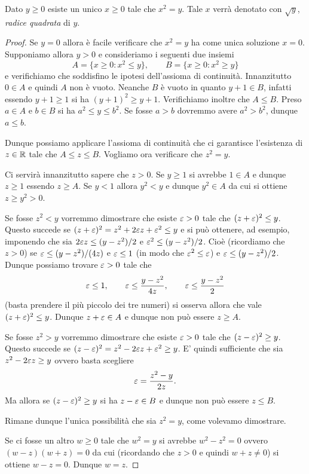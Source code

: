 \begin{theorem}
\label{th:radice_quadrata}
\mymark{***}
Dato $y\ge 0$ esiste un unico $x\ge 0$ tale che $x^2=y$.
Tale $x$ verrà denotato con $\sqrt y$, \emph{radice quadrata} di $y$.
\mymargin{$\sqrt{\cdot}$}
\end{theorem}
\begin{proof}
\mymark{*}
Se $y=0$ allora è facile verificare che $x^2=y$ ha come unica soluzione $x=0$.
Supponiamo allora $y>0$ e
consideriamo i seguenti due insiemi
\[
  A = \{x\ge 0 \colon x^2 \le y\},\qquad
  B = \{x\ge 0 \colon x^2 \ge y\}
\]
e verifichiamo che soddisfino le ipotesi dell'assioma di continuità.
Innanzitutto $0\in A$ e quindi $A$ non è vuoto.
Neanche $B$ è vuoto in quanto $y+1\in B$,
infatti essendo $y+1\ge 1$ si ha
$(y+1)^2 \ge y+1$. Verifichiamo inoltre che $A \le B$.
Preso $a\in A$ e $b\in B$ si ha $a^2 \le y \le b^2$.
Se fosse $a>b$ dovremmo avere $a^2>b^2$, dunque $a \le b$.

Dunque possiamo applicare l'assioma di continuità
che ci garantisce l'esistenza di $z\in \mathbb R$ tale che $A \le z \le B$.
Vogliamo ora verificare che $z^2 = y$.

Ci servirà innanzitutto sapere che $z>0$. Se $y\ge 1$ si avrebbe $1\in A$
e dunque $z\ge 1$ essendo $z\ge A$. Se $y<1$ allora $y^2 < y$ e dunque $y^2 \in A$
da cui si ottiene $z\ge y^2 > 0$.

Se fosse $z^2 < y$ vorremmo dimostrare che esiste $\varepsilon>0$ tale che
$(z+\varepsilon)^2 \le y$.
Questo succede se $(z+\varepsilon)^2 = z^2 + 2 \varepsilon z + \varepsilon^2 \le y$
e si può ottenere, ad esempio,
imponendo che sia $2\varepsilon z \le (y-z^2)/2$ e $\varepsilon^2 \le (y-z^2)/2$.
Cioè (ricordiamo che $z>0$) se $\varepsilon \le (y-z^2)/(4z)$ e $\varepsilon \le 1$
(in modo che $\varepsilon^2 \le \varepsilon$)
e $\varepsilon \le (y-z^2)/2$. Dunque possiamo
trovare $\varepsilon>0$
tale che
\[
\varepsilon \le 1, \qquad
\varepsilon \le \frac{y-z^2}{4z}, \qquad
\varepsilon \le \frac{y-z^2}2
\]
(basta prendere il più piccolo dei tre numeri)
si osserva allora
che vale $(z+\varepsilon)^2\le y$.
Dunque $z+\varepsilon \in A$ e dunque non può essere $z\ge A$.

Se fosse $z^2 > y$ vorremmo dimostrare che esiste $\varepsilon>0$ tale che
$(z-\varepsilon)^2 \ge y$.
Questo succede se $(z-\varepsilon)^2 = z^2 - 2\varepsilon z + \varepsilon^2 \ge y$.
E' quindi sufficiente che sia $z^2 - 2 \varepsilon z \ge y$ ovvero basta scegliere
\[
  \varepsilon = \frac{z^2-y}{2z}.
\]
Ma allora se $(z-\varepsilon)^2\ge y$ si ha $z-\varepsilon \in B$ e dunque non può
essere $z \le B$.

Rimane dunque l'unica possibilità che sia $z^2 = y$, come volevamo dimostrare.

Se ci fosse un altro $w\ge 0$ tale che $w^2 = y$ si avrebbe $w^2 - z^2=0$ ovvero
$(w-z)(w+z)=0$ da cui (ricordando che $z>0$ e quindi $w+z\neq 0$)
si ottiene $w-z=0$. Dunque $w=z$.
\end{proof}


